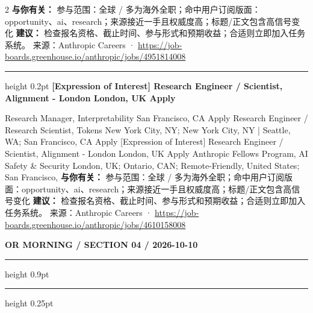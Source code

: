 \documentclass[10.5pt]{ctexart}
\begin{document}
\begin{multicols}{2}
\textbf{与你有关：} 参与范围：全球 / 多为海外全职；命中用户订阅版面：opportunity、ai、research；来源接近一手且权威度高；标题/正文包含高信号变化
\textbf{建议：} 检查报名资格、截止时间、参与形式和预期收益；合适则立即加入任务系统。
{\footnotesize\color{ormuted} 来源：Anthropic Careers · \url{https://job-boards.greenhouse.io/anthropic/jobs/4951814008}}
\vspace{2mm}
\hrule height 0.2pt
\vspace{2mm}
{\large\bfseries [Expression of Interest] Research Engineer / Scientist, Alignment - London London, UK Apply}\par
[Expression of Interest] Research Manager, Interpretability San Francisco, CA Apply Research Engineer / Research Scientist, Tokens New York City, NY; New York City, NY | Seattle, WA; San Francisco, CA Apply [Expression of Interest] Research Engineer / Scientist, Alignment - London London, UK Apply Anthropic Fellows Program, AI Safety \& Security London, UK; Ontario, CAN; Remote-Friendly, United States; San Francisco, 
\textbf{与你有关：} 参与范围：全球 / 多为海外全职；命中用户订阅版面：opportunity、ai、research；来源接近一手且权威度高；标题/正文包含高信号变化
\textbf{建议：} 检查报名资格、截止时间、参与形式和预期收益；合适则立即加入任务系统。
{\footnotesize\color{ormuted} 来源：Anthropic Careers · \url{https://job-boards.greenhouse.io/anthropic/jobs/4610158008}}
\end{multicols}
\newpage
{\small\bfseries OR MORNING / SECTION 04 / 2026-10-10}
\vspace{2mm}
\hrule height 0.9pt
\vspace{1.5mm}
\hrule height 0.25pt
\vspace{4mm}
\end{document}
